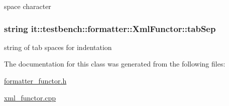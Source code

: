 space character \hypertarget{classit_1_1testbench_1_1formatter_1_1XmlFunctor_a23d44086211ff4a7dd412bf96a284126}{
\subsubsection[{tab\-Sep}]{\setlength{\rightskip}{0pt plus 5cm}string it\-::testbench\-::formatter\-::\-Xml\-Functor\-::tab\-Sep\hspace{0.3cm}{\ttfamily [private]}}}\label{d4/d4d/classit_1_1testbench_1_1formatter_1_1XmlFunctor_a23d44086211ff4a7dd412bf96a284126}
string of tab spaces for indentation 

The documentation for this class was generated from the following files\-:\begin{DoxyCompactItemize}
\item 
\hyperlink{formatter__functor_8h}{formatter\-\_\-functor.\-h}\item 
\hyperlink{xml__functor_8cpp}{xml\-\_\-functor.\-cpp}\end{DoxyCompactItemize}
